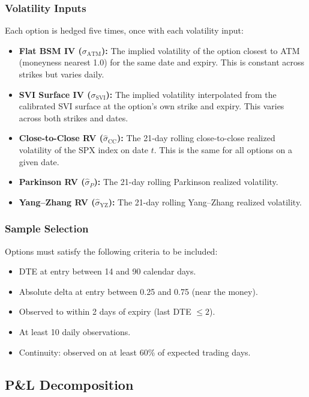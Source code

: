 \documentclass[12pt, letterpaper]{article}
\begin{document}
\subsubsection{Volatility Inputs}

Each option is hedged five times, once with each volatility input:

\begin{itemize}
    \item \textbf{Flat BSM IV ($\sigma_{\text{ATM}}$):} The implied volatility of the option closest to ATM (moneyness nearest 1.0) for the same date and expiry. This is constant across strikes but varies daily.
    \item \textbf{SVI Surface IV ($\sigma_{\text{SVI}}$):} The implied volatility interpolated from the calibrated SVI surface at the option's own strike and expiry. This varies across both strikes and dates.
    \item \textbf{Close-to-Close RV ($\hat{\sigma}_{\text{CC}}$):} The 21-day rolling close-to-close realized volatility of the SPX index on date $t$. This is the same for all options on a given date.
    \item \textbf{Parkinson RV ($\hat{\sigma}_P$):} The 21-day rolling Parkinson realized volatility.
    \item \textbf{Yang--Zhang RV ($\hat{\sigma}_{\text{YZ}}$):} The 21-day rolling Yang--Zhang realized volatility.
\end{itemize}

\subsubsection{Sample Selection}

Options must satisfy the following criteria to be included:

\begin{itemize}
    \item DTE at entry between 14 and 90 calendar days.
    \item Absolute delta at entry between 0.25 and 0.75 (near the money).
    \item Observed to within 2 days of expiry (last DTE $\leq 2$).
    \item At least 10 daily observations.
    \item Continuity: observed on at least 60\% of expected trading days.
\end{itemize}

\subsection{P\&L Decomposition}
\label{sec:pnl_decomp}
\end{document}
